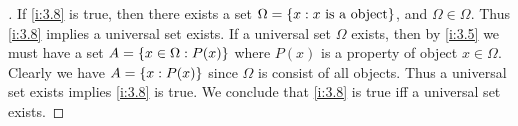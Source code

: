 \begin{proof}[]
  If \cref{i:3.8} is true, then there exists a set \(\Omega = \left\lbrace x : x \text{ is a object}\right\rbrace\), and \(\Omega \in \Omega\).
  Thus \cref{i:3.8} implies a universal set exists.
  If a universal set \(\Omega\) exists, then by \cref{i:3.5} we must have a set \(A = \left\lbrace x \in \Omega : P(x)\right\rbrace\) where \(P(x)\) is a property of object \(x \in \Omega\).
  Clearly we have \(A = \left\lbrace x : P(x)\right\rbrace\) since \(\Omega\) is consist of all objects.
  Thus a universal set exists implies \cref{i:3.8} is true.
  We conclude that \cref{i:3.8} is true iff a universal set exists.
\end{proof}
